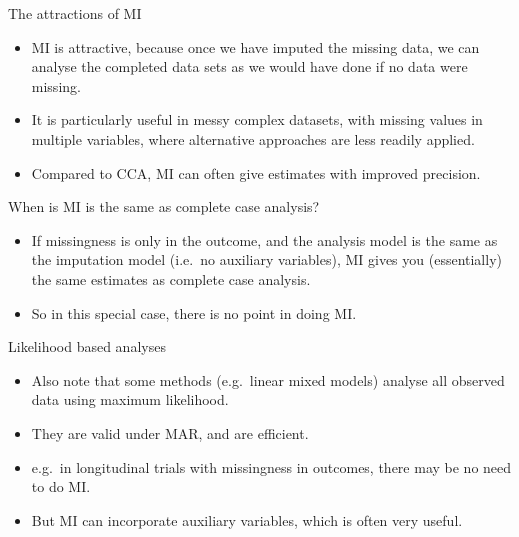 \documentclass[ignorenonframetext,]{beamer}
\providecommand{\tightlist}{%
  \setlength{\itemsep}{0pt}\setlength{\parskip}{0pt}}
\begin{document}
\begin{frame}{The attractions of MI}
\protect\hypertarget{the-attractions-of-mi}{}

\begin{itemize}
\tightlist
\item
  MI is attractive, because once we have imputed the missing data, we
  can analyse the completed data sets as we would have done if no data
  were missing.
\item
  It is particularly useful in messy complex datasets, with missing
  values in multiple variables, where alternative approaches are less
  readily applied.
\item
  Compared to CCA, MI can often give estimates with improved precision.
\end{itemize}

\end{frame}

\begin{frame}{When is MI is the same as complete case analysis?}
\protect\hypertarget{when-is-mi-is-the-same-as-complete-case-analysis}{}

\begin{itemize}
\tightlist
\item
  If missingness is only in the outcome, and the analysis model is the
  same as the imputation model (i.e.~no auxiliary variables), MI gives
  you (essentially) the same estimates as complete case analysis.
\item
  So in this special case, there is no point in doing MI.
\end{itemize}

\end{frame}

\begin{frame}{Likelihood based analyses}
\protect\hypertarget{likelihood-based-analyses}{}

\begin{itemize}
\tightlist
\item
  Also note that some methods (e.g.~linear mixed models) analyse all
  observed data using maximum likelihood.
\item
  They are valid under MAR, and are efficient.
\item
  e.g.~in longitudinal trials with missingness in outcomes, there may be
  no need to do MI.
\item
  But MI can incorporate auxiliary variables, which is often very
  useful.
\end{itemize}

\end{frame}
\end{document}
